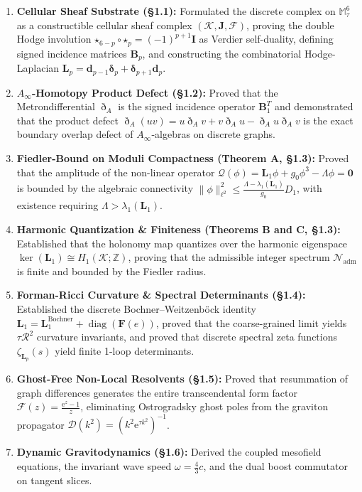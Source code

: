 \documentclass[
    12pt,
    a4paper,
    headings=normal,
    twoside=false,
    open=any,
    parskip=half
]{scrbook}
\newcommand{\ethop}{\eth}
\newcommand{\eu}{\mathrm{e}}
\newcommand{\spectrumN}{\mathcal{N}_{\text{adm}}}
\begin{document}
\begin{tcolorbox}[colback=maincolor!3!white, colframe=maincolor!80!black, title={\textbf{Grand Synthesis of Chapter 1}}]
\begin{enumerate}[leftmargin=1.5em, itemsep=4pt]
    \item \textbf{Cellular Sheaf Substrate (§1.1):} Formulated the discrete complex on $\mathbb{M}_\tau^6$ as a constructible cellular sheaf complex $(\mathcal{K}, \mathbf{J}, \mathscr{F})$, proving the double Hodge involution $\boldsymbol{\star}_{6-p} \circ \boldsymbol{\star}_p = (-1)^{p+1} \mathbf{I}$ as Verdier self-duality, defining signed incidence matrices $\mathbf{B}_p$, and constructing the combinatorial Hodge-Laplacian $\mathbf{L}_p = \mathbf{d}_{p-1}\boldsymbol{\delta}_p + \boldsymbol{\delta}_{p+1}\mathbf{d}_p$.
    \item \textbf{$A_\infty$-Homotopy Product Defect (§1.2):} Proved that the Metrondifferential $\ethop_A$ is the signed incidence operator $\mathbf{B}_1^T$ and demonstrated that the product defect $\ethop_A(uv) = u\ethop_A v + v\ethop_A u - \ethop_A u \ethop_A v$ is the exact boundary overlap defect of $A_\infty$-algebras on discrete graphs.
    \item \textbf{Fiedler-Bound on Moduli Compactness (Theorem A, §1.3):} Proved that the amplitude of the non-linear operator $\mathcal{Q}(\phi) = \mathbf{L}_1 \phi + g_0 \phi^3 - \Lambda \phi = \mathbf{0}$ is bounded by the algebraic connectivity $\|\phi\|_{\ell^2}^2 \le \frac{\Lambda - \lambda_1(\mathbf{L}_1)}{g_0} D_1$, with existence requiring $\Lambda > \lambda_1(\mathbf{L}_1)$.
    \item \textbf{Harmonic Quantization \& Finiteness (Theorems B and C, §1.3):} Established that the holonomy map quantizes over the harmonic eigenspace $\ker(\mathbf{L}_1) \cong H_1(\mathcal{K}; \mathbb{Z})$, proving that the admissible integer spectrum $\spectrumN$ is finite and bounded by the Fiedler radius.
    \item \textbf{Forman-Ricci Curvature \& Spectral Determinants (§1.4):} Established the discrete Bochner--Weitzenböck identity $\mathbf{L}_1 = \mathbf{L}_1^{\text{Bochner}} + \operatorname{diag}(\mathbf{F}(e))$, proved that the coarse-grained limit yields $\tau \mathcal{R}^2$ curvature invariants, and proved that discrete spectral zeta functions $\zeta_{\mathbf{L}_p}(s)$ yield finite 1-loop determinants.
    \item \textbf{Ghost-Free Non-Local Resolvents (§1.5):} Proved that resummation of graph differences generates the entire transcendental form factor $\mathcal{F}(z) = \frac{\eu^z - 1}{z}$, eliminating Ostrogradsky ghost poles from the graviton propagator $\mathcal{D}(k^2) = (k^2 \eu^{\tau k^2})^{-1}$.
    \item \textbf{Dynamic Gravitodynamics (§1.6):} Derived the coupled mesofield equations, the invariant wave speed $\omega = \frac{4}{3}c$, and the dual boost commutator on tangent slices.
\end{enumerate}
\end{tcolorbox}
\end{document}
